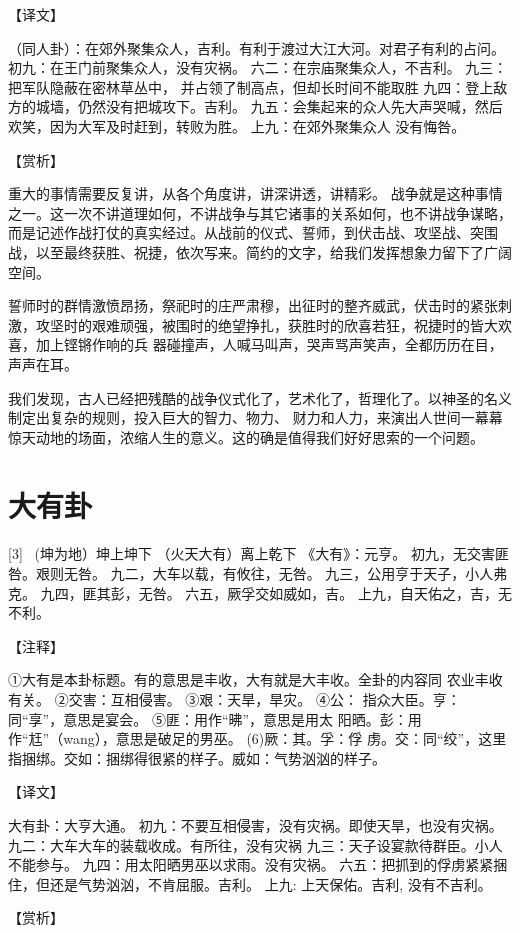 \documentclass[12pt,UTF8]{ctexbook}
\begin{document}
【译文】

（同人卦）：在郊外聚集众人，吉利。有利于渡过大江大河。对君子有利的占问。
初九：在王门前聚集众人，没有灾祸。
六二：在宗庙聚集众人，不吉利。
九三：把军队隐蔽在密林草丛中， 并占领了制高点，但却长时间不能取胜
九四：登上敌方的城墙，仍然没有把城攻下。吉利。
九五：会集起来的众人先大声哭喊，然后欢笑，因为大军及时赶到，转败为胜。
上九：在郊外聚集众人 没有悔咎。

【赏析】

重大的事情需要反复讲，从各个角度讲，讲深讲透，讲精彩。 战争就是这种事情之一。这一次不讲道理如何，不讲战争与其它诸事的关系如何，也不讲战争谋略，而是记述作战打仗的真实经过。从战前的仪式、誓师，到伏击战、攻坚战、突围战，以至最终获胜、祝捷，依次写来。简约的文字，给我们发挥想象力留下了广阔空间。

誓师时的群情激愤昂扬，祭祀时的庄严肃穆，出征时的整齐威武，伏击时的紧张刺激，攻坚时的艰难顽强，被围时的绝望挣扎，获胜时的欣喜若狂，祝捷时的皆大欢喜，加上铿锵作响的兵 器碰撞声，人喊马叫声，哭声骂声笑声，全都历历在目，声声在耳。

我们发现，古人已经把残酷的战争仪式化了，艺术化了，哲理化了。以神圣的名义制定出复杂的规则，投入巨大的智力、物力、 财力和人力，来演出人世间一幕幕惊天动地的场面，浓缩人生的意义。这的确是值得我们好好思索的一个问题。

\chapter{大有卦}
[3] \ (坤为地）坤上坤下
（火天大有）离上乾下
《大有》：元亨。
初九，无交害匪咎。艰则无咎。
九二，大车以载，有攸往，无咎。
九三，公用亨于天子，小人弗克。
九四，匪其彭，无咎。
六五，厥孚交如威如，吉。
上九，自天佑之，吉，无不利。

【注释】

①大有是本卦标题。有的意思是丰收，大有就是大丰收。全卦的内容同 农业丰收有关。
②交害：互相侵害。
③艰：天旱，旱灾。
④公： 指众大臣。亨：同“享”，意思是宴会。
⑤匪：用作“昲”，意思是用太 阳晒。彭：用作“尪”（wang），意思是破足的男巫。
(6)厥：其。孚：俘 虏。交：同“绞”，这里指捆绑。交如：捆绑得很紧的样子。威如：气势汹汹的样子。

【译文】

大有卦：大亨大通。
初九：不要互相侵害，没有灾祸。即使天旱，也没有灾祸。
九二：大车大车的装载收成。有所往，没有灾祸
九三：天子设宴款待群臣。小人不能参与。
九四：用太阳晒男巫以求雨。没有灾祸。
六五：把抓到的俘虏紧紧捆住，但还是气势汹汹，不肯屈服。吉利。
上九: 上天保佑。吉利, 没有不吉利。

【赏析】
\end{document}
